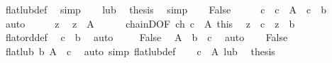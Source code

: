 \begin{isabellebody}
\ flat{\isacharunderscore}{\kern0pt}lub{\isacharunderscore}{\kern0pt}def\ \isamarkupfalse%
\ simp\isanewline
\ \ \isamarkupfalse%
\ lub\ \isamarkupfalse%
\ {\isacharquery}{\kern0pt}thesis\ \isamarkupfalse%
\ simp\isanewline
{}\isamarkupfalse%
\isanewline
\ \ \isamarkupfalse%
\ False\isanewline
\ \ \isamarkupfalse%
\ \isamarkupfalse%
\ c\ \ {\isachardoublequoteopen}c\ {\isasymin}\ A{\isachardoublequoteclose}\ \ {\isachardoublequoteopen}c\ {\isasymnoteq}\ b{\isachardoublequoteclose}\ \isamarkupfalse%
\ auto\isanewline
\ \ \isacommand{{\isacharbraceleft}{\kern0pt}}\isamarkupfalse%
\ \isamarkupfalse%
\ z\ \isamarkupfalse%
\ {\isachardoublequoteopen}z\ {\isasymin}\ A{\isachardoublequoteclose}\isanewline
\ \ \ \ \isamarkupfalse%
\ chainD{\isacharbrackleft}{\kern0pt}OF\ ch\ {\isacartoucheopen}c\ {\isasymin}\ A{\isacartoucheclose}\ this{\isacharbrackright}{\kern0pt}\ \isamarkupfalse%
\ {\isachardoublequoteopen}z\ {\isacharequal}{\kern0pt}\ c\ {\isasymor}\ z\ {\isacharequal}{\kern0pt}\ b{\isachardoublequoteclose}\isanewline
\ \ \ \ \ \ \isamarkupfalse%
\ flat{\isacharunderscore}{\kern0pt}ord{\isacharunderscore}{\kern0pt}def\ \isamarkupfalse%
\ {\isacartoucheopen}c\ {\isasymnoteq}\ b{\isacartoucheclose}\ \isamarkupfalse%
\ auto\ \isacommand{{\isacharbraceright}{\kern0pt}}\isamarkupfalse%
\isanewline
\ \ \isamarkupfalse%
\ False\ \isamarkupfalse%
\ {\isachardoublequoteopen}A\ {\isacharminus}{\kern0pt}\ {\isacharbraceleft}{\kern0pt}b{\isacharbraceright}{\kern0pt}\ {\isacharequal}{\kern0pt}\ {\isacharbraceleft}{\kern0pt}c{\isacharbraceright}{\kern0pt}{\isachardoublequoteclose}\ \isamarkupfalse%
\ auto\isanewline
\ \ \isamarkupfalse%
\ False\ \isamarkupfalse%
\ {\isachardoublequoteopen}flat{\isacharunderscore}{\kern0pt}lub\ b\ A\ {\isacharequal}{\kern0pt}\ c{\isachardoublequoteclose}\ \isamarkupfalse%
\ {\isacharparenleft}{\kern0pt}auto\ simp{\isacharcolon}{\kern0pt}\ flat{\isacharunderscore}{\kern0pt}lub{\isacharunderscore}{\kern0pt}def{\isacharparenright}{\kern0pt}\isanewline
\ \ \isamarkupfalse%
\ {\isacartoucheopen}c\ {\isasymin}\ A{\isacartoucheclose}\ lub\ \isamarkupfalse%
\ {\isacharquery}{\kern0pt}thesis\ \isamarkupfalse%

\end{isabellebody}
